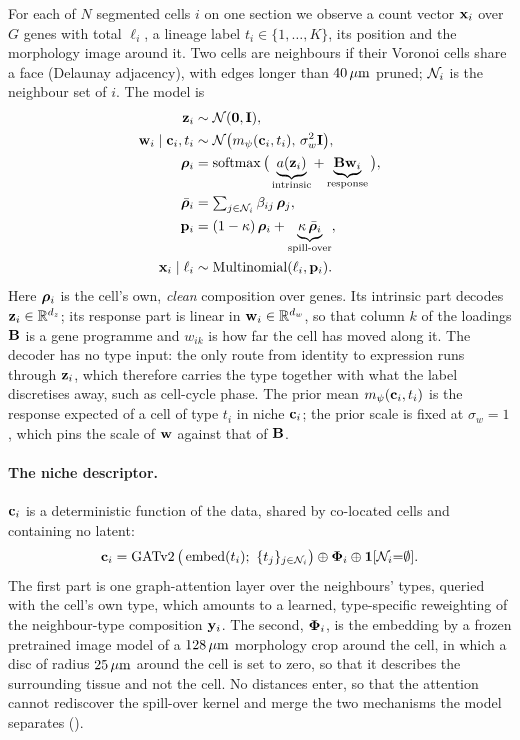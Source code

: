 For each of $N$ segmented cells $i$ on one section we observe a count vector $\mathbf{x}_i$ over $G$ genes with total $\ell_i$, a lineage label $t_i \in \{1,\dots,K\}$, its position and the morphology image around it. Two cells are neighbours if their Voronoi cells share a face (Delaunay adjacency), with edges longer than $40\,\mu\text{m}$ pruned; $\mathcal{N}_{i}$ is the neighbour set of $i$. The model is
\begin{align}
  \mathbf{z}_i &\sim \mathcal{N}(\mathbf{0}, \mathbf{I}), \label{eq:gen-z}\\
  \mathbf{w}_i \mid \mathbf{c}_i, t_i &\sim \mathcal{N}\big(m_{\psi}(\mathbf{c}_i, t_i),\, \sigma_w^2 \mathbf{I}\big), \label{eq:gen-w}\\
  \boldsymbol{\rho}_i &= \operatorname{softmax}\big(\underbrace{a(\mathbf{z}_i)}_{\text{intrinsic}} + \underbrace{\mathbf{B}\mathbf{w}_i}_{\text{response}}\big), \label{eq:gen-rho}\\
  \bar{\boldsymbol{\rho}}_i &= \textstyle\sum_{j \in \mathcal{N}_{i}} \beta_{ij}\, \boldsymbol{\rho}_j, \label{eq:gen-rhobar}\\
  \mathbf{p}_i &= (1-\kappa)\, \boldsymbol{\rho}_i + \underbrace{\kappa\, \bar{\boldsymbol{\rho}}_i}_{\text{spill-over}}, \label{eq:gen-p}\\
  \mathbf{x}_i \mid \ell_i &\sim \operatorname{Multinomial}(\ell_i, \mathbf{p}_i). \label{eq:gen-x}
\end{align}
Here $\boldsymbol{\rho}_i$ is the cell's own, \emph{clean} composition over genes. Its intrinsic part decodes $\mathbf{z}_i \in \mathbb{R}^{d_z}$; its response part is linear in $\mathbf{w}_i \in \mathbb{R}^{d_w}$, so that column $k$ of the loadings $\mathbf{B}$ is a gene programme and $w_{ik}$ is how far the cell has moved along it. The decoder has no type input: the only route from identity to expression runs through $\mathbf{z}_i$, which therefore carries the type together with what the label discretises away, such as cell-cycle phase. The prior mean $m_{\psi}(\mathbf{c}_i, t_i)$ is the response expected of a cell of type $t_i$ in niche $\mathbf{c}_i$; the prior scale is fixed at $\sigma_w = 1$, which pins the scale of $\mathbf{w}$ against that of $\mathbf{B}$.

\paragraph{The niche descriptor.}
$\mathbf{c}_i$ is a deterministic function of the data, shared by co-located cells and containing no latent:
\begin{equation}
  \mathbf{c}_i = \operatorname{GATv2}\big(\operatorname{embed}(t_i);\ \{t_j\}_{j \in \mathcal{N}_{i}}\big) \oplus \boldsymbol{\Phi}_i \oplus \mathbf{1}[\mathcal{N}_{i} {=} \emptyset].
  \label{eq:context-gat}
\end{equation}
The first part is one graph-attention layer \citep{brody2022} over the neighbours' types, queried with the cell's own type, which amounts to a learned, type-specific reweighting of the neighbour-type composition $\mathbf{y}_i$. The second, $\boldsymbol{\Phi}_i$, is the embedding by a frozen pretrained image model \citep{kronos2025} of a $128\,\mu\text{m}$ morphology crop around the cell, in which a disc of radius $25\,\mu\text{m}$ around the cell is set to zero, so that it describes the surrounding tissue and not the cell. No distances enter, so that the attention cannot rediscover the spill-over kernel and merge the two mechanisms the model separates ().


